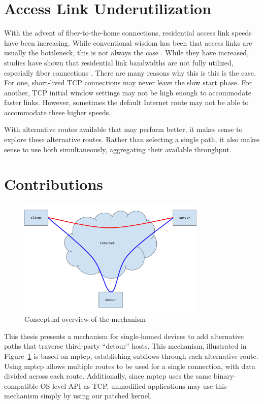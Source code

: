 \documentclass{cwru}
\begin{document}
\section{Access Link Underutilization}

With the advent of fiber-to-the-home connections, residential access link speeds
have been increasing. While conventional wisdom has been that access links are
usually the bottleneck, this is not always the case \cite{akella2003empirical}.
While they have increased, studies have shown that residential link bandwidths
are not fully utilized, especially fiber connections \cite{fibertothehome}.
There are many reasons why this is this is the case. For one, short-lived TCP
connections may never leave the slow start phase. For another, TCP initial
window settings may not be high enough to accommodate faster links. However,
sometimes the default Internet route may not be able to accommodate these higher
speeds.

With alternative routes available that may perform better, it makes sense to
explore these alternative routes. Rather than selecting a single path, it also
makes sense to use both simultaneously, aggregating their available throughput.

\section{Contributions}

\begin{figure}
  \centering
  \includegraphics[width=0.8\textwidth]{figures/Concept.pdf}
  \caption{Conceptual overview of the mechanism}
  \label{fig:concept}
\end{figure}

This thesis presents a mechanism for single-homed devices to add alternative
paths that traverse third-party ``detour'' hosts. This mechanism, illustrated in
Figure~\ref{fig:concept} is based on \ac{mptcp}, establishing subflows through
each alternative route. Using \ac{mptcp} allows multiple routes to be used for a
single connection, with data divided across each route. Additionally, since
\ac{mptcp} uses the same binary-compatible OS level API as TCP, unmodified
applications may use this mechanism simply by using our patched kernel.
\end{document}
